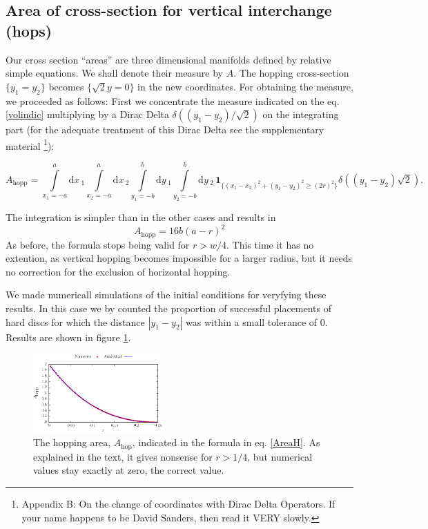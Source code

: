 \documentclass[superscriptaddress,pre,reprint,showpacs,onecolumn]{revtex4-1}
\newcommand{\rd}[1]{\mathrm{d}{#1} \,}
\newcommand{\indicator}[1]{\mathbf{1}_{ \{   #1 \} } }
\begin{document}


\subsection{Area of cross-section for
 vertical interchange (hops)}\label{areahop}

Our cross section ``areas'' are three dimensional manifolds
defined by relative simple equations. We shall denote their
measure by $A$.
The hopping cross-section 
$ \{y_1 = y_2\}$ becomes 
$\{ \sqrt{2}y=0 \}$ in the new coordinates.
For obtaining the measure,
we proceeded as follows:
First we concentrate the measure indicated on the eq. \ref{volindic}
multiplying by a Dirac Delta $\delta((y_1-y_2)/\sqrt{2})$ on the integrating part
(for the adequate treatment of this Dirac Delta see the supplementary 
material \footnote{Appendix B: On the change of coordinates with Dirac Delta 
Operators. If your name happens to be David Sanders, then read it VERY slowly.}):
\begin{widetext}
\begin{equation}
 A_\text{hopp} = \int\limits_{x_1 = -a}^a \rd x_1 \int\limits_{x_2 = -a}^a \rd x_2 
\int\limits_{y_1 = -b}^b \rd y_1 \int\limits_{y_2 = -b}^b \rd y_2 \, \indicator{ (x_1-x_2)^2 + (y_1-y_2)^2 \ge (2r)^2 } \delta((y_1-y_2)\sqrt{2}).
\end{equation}
\end{widetext}
The integration is
simpler than in the other cases and results in 
\begin{equation}
 A_\text{hopp}  =  16 b(a-r)^2
\end{equation}
As before, the formula stops being valid for $r>w/4$. This time it has
no extention, as vertical hopping becomes impossible for a larger radius,
but it needs no correction for the exclusion of horizontal hopping. 

We made numericall simulations of the initial conditions for
veryfying these results. In this case we 
by counted the proportion of successful placements of hard discs 
for which the distance 
$|y_1 - y_2|$ was within a small tolerance of $0$. 
Results are shown in figure \ref{AreaHopp01}.

\begin{figure}[h]
\centering
\includegraphics[width=0.45\textwidth]{./FigurasPerfectas/AreaHop02.pdf}
\caption{The hopping area, $A_\text{hop}$, 
  indicated in the formula in eq. \ref{AreaH}. As explained
in the text, it gives nonsense for $r>1/4$, but numerical values stay
exactly at zero, the correct value. } 
\label{AreaHopp01}
\end{figure}
\end{document}
